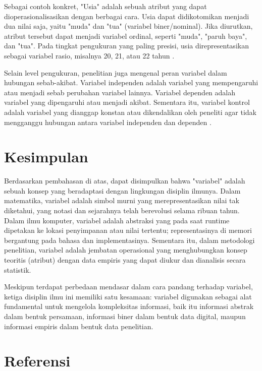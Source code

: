 \documentclass[11pt,a4paper]{article}
\begin{document}
Sebagai contoh konkret, "Usia" adalah sebuah atribut yang dapat dioperasionalisasikan dengan berbagai cara. Usia dapat didikotomikan menjadi dua nilai saja, yaitu "muda" dan "tua" (variabel biner/nominal). Jika diurutkan, atribut tersebut dapat menjadi variabel ordinal, seperti "muda", "paruh baya", dan "tua". Pada tingkat pengukuran yang paling presisi, usia direpresentasikan sebagai variabel rasio, misalnya 20, 21, atau 22 tahun \cite{wikipedia_research}.

Selain level pengukuran, penelitian juga mengenal peran variabel dalam hubungan sebab-akibat. Variabel independen adalah variabel yang mempengaruhi atau menjadi sebab perubahan variabel lainnya. Variabel dependen adalah variabel yang dipengaruhi atau menjadi akibat. Sementara itu, variabel kontrol adalah variabel yang dianggap konstan atau dikendalikan oleh peneliti agar tidak mengganggu hubungan antara variabel independen dan dependen \cite{babbie}.

\section{Kesimpulan}

Berdasarkan pembahasan di atas, dapat disimpulkan bahwa "variabel" adalah sebuah konsep yang beradaptasi dengan lingkungan disiplin ilmunya. Dalam matematika, variabel adalah simbol murni yang merepresentasikan nilai tak diketahui, yang notasi dan sejarahnya telah berevolusi selama ribuan tahun. Dalam ilmu komputer, variabel adalah abstraksi yang pada saat runtime dipetakan ke lokasi penyimpanan atau nilai tertentu; representasinya di memori bergantung pada bahasa dan implementasinya. Sementara itu, dalam metodologi penelitian, variabel adalah jembatan operasional yang menghubungkan konsep teoritis (atribut) dengan data empiris yang dapat diukur dan dianalisis secara statistik.

Meskipun terdapat perbedaan mendasar dalam cara pandang terhadap variabel, ketiga disiplin ilmu ini memiliki satu kesamaan: variabel digunakan sebagai alat fundamental untuk mengelola kompleksitas informasi, baik itu informasi abstrak dalam bentuk persamaan, informasi biner dalam bentuk data digital, maupun informasi empiris dalam bentuk data penelitian.

\newpage
\section*{Referensi}
\end{document}
